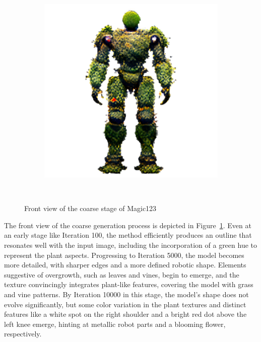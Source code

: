 \begin{figure}[ht]
\begin{subfigure}[b]{0.25\textwidth}
        \includegraphics[width=\textwidth]{etc/a robot made out of plants/magic123/magic123_coarse_robot_front_10000_part1.png}
        \caption{}
    \end{subfigure}
    \caption{Front view of the coarse stage of Magic123}~\label{fig:generationFrontCoarseMagic123}
\end{figure}

The front view of the coarse generation process is depicted in Figure~\ref{fig:generationFrontCoarseMagic123}. Even at an early stage like Iteration 100, the method efficiently produces an outline that resonates well with the input image, including the incorporation of a green hue to represent the plant aspects. Progressing to Iteration 5000, the model becomes more detailed, with sharper edges and a more defined robotic shape. Elements suggestive of overgrowth, such as leaves and vines, begin to emerge, and the texture convincingly integrates plant-like features, covering the model with grass and vine patterns. By Iteration 10000 in this stage, the model's shape does not evolve significantly, but some color variation in the plant textures and distinct features like a white spot on the right shoulder and a bright red dot above the left knee emerge, hinting at metallic robot parts and a blooming flower, respectively.

